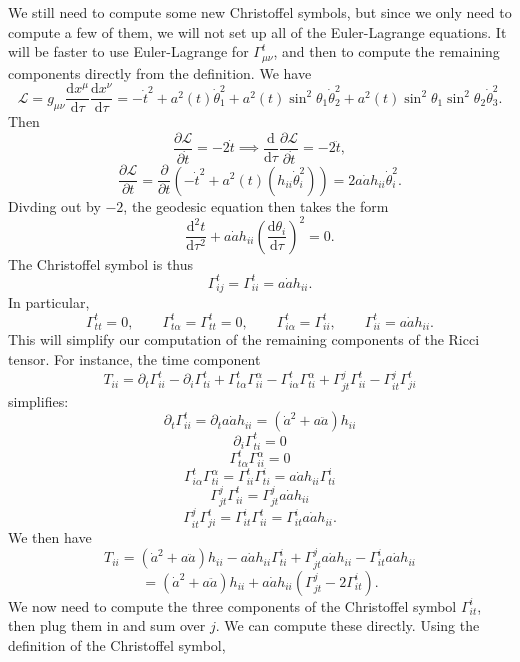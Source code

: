 \documentclass[11pt, letterpaper]{article}
\begin{document}
We still need to compute some new Christoffel symbols, but since we only need to compute a few of them, we will not set up all of the Euler-Lagrange equations. It will be faster to use Euler-Lagrange for $\Gamma ^t_{\mu \nu } $, and then to compute the remaining components directly from the definition. We have
\[
	\mathcal{L} =g_{\mu \nu } \frac{\mathrm{d}x^\mu }{\mathrm{d}\tau } \frac{\mathrm{d}x^\nu }{\mathrm{d}\tau } =-\dot{t} ^2 + a^2(t) \dot{\theta } _1^2 + a^2(t) \sin ^2\theta _1 \dot{\theta } _2^2 + a^2(t) \sin ^2\theta _1 \sin ^2\theta _2 \dot{\theta } _3^2
.\]
Then
\[
	\frac{\partial \mathcal{L} }{\partial \dot{t} } =-2 \dot{t}  \implies \frac{\mathrm{d}}{\mathrm{d}\tau } \frac{\partial \mathcal{L} }{\partial \dot{t} } =-2 \ddot{t} 
,\]
\[
	\frac{\partial \mathcal{L} }{\partial t} =\frac{\partial }{\partial t} \left( - \dot{t} ^2 + a^2(t)\left(h_{ii} \dot{\theta } _i^2 \right)  \right) =2 a \dot{a} h_{ii} \dot{\theta } _i^2
.\]
Divding out by $-2$, the geodesic equation then takes the form
\[
	\frac{\mathrm{d}^2t}{\mathrm{d}\tau ^2} +a \dot{a} h_{ii} \left( \frac{\mathrm{d}\theta _i}{\mathrm{d}\tau }  \right) ^2=0
.\]
The Christoffel symbol is thus
\[
	\Gamma ^t_{ij} =\Gamma ^t_{ii} =a \dot{a} h_{ii} 
.\]
In particular,
\[
	\Gamma ^t_{tt} =0,\qquad \Gamma ^t_{t\alpha } =\Gamma ^t_{tt} =0,\qquad \Gamma ^t_{i\alpha } =\Gamma ^t_{ii},\qquad \Gamma ^t_{ii} =a \dot{a} h_{ii} 
.\]
This will simplify our computation of the remaining components of the Ricci tensor. For instance, the time component
\[
	T_{ii} =\partial _t\Gamma ^t_{ii} -\partial _i\Gamma ^t_{ti} +\Gamma ^t_{t\alpha } \Gamma ^\alpha _{ii} -\Gamma ^t_{i\alpha } \Gamma ^\alpha _{ti} +\Gamma ^j_{jt} \Gamma ^t_{ii} -\Gamma ^j_{it} \Gamma ^t_{ji} 
\]
simplifies:
\[
	\partial_t\Gamma ^t_{ii} =\partial _t a \dot{a} h_{ii} =\left( \dot{a} ^2+a \ddot{a}  \right) h_{ii} 
\]
\[
	\partial _i\Gamma ^t_{ti} =0
\]
\[
	\Gamma ^t_{t\alpha } \Gamma ^\alpha _{ii}=0
\]
\[
	\Gamma ^t_{i\alpha } \Gamma ^\alpha _{ti} = \Gamma ^t_{ii} \Gamma ^i_{ti} =a \dot{a} h_{ii}\Gamma ^i_{ti}  
\]
\[
	\Gamma ^j_{jt} \Gamma ^t_{ii} =\Gamma ^j_{jt} a \dot{a} h_{ii} 
\]
\[
	\Gamma ^j_{it} \Gamma ^t_{ji} =\Gamma ^i_{it} \Gamma ^t_{ii} = \Gamma ^i_{it} a \dot{a} h_{ii} 
.\]
We then have
\[
	T_{ii} = \left( \dot{a} ^2+a \ddot{a}  \right) h_{ii} -a \dot{a} h_{ii} \Gamma ^i_{ti} +\Gamma ^j_{jt} a \dot{a} h_{ii} - \Gamma ^i_{it} a \dot{a} h_{ii} 
\]
\[
	=\left( \dot{a} ^2 + a \ddot{a}  \right) h_{ii} + a \dot{a} h_{ii} \left( \Gamma ^j_{jt} -2\Gamma ^i_{it}  \right) 
.\]
We now need to compute the three components of the Christoffel symbol $\Gamma ^i_{it} $, then plug them in and sum over $j$. We can compute these directly. Using the definition of the Christoffel symbol,
\end{document}
